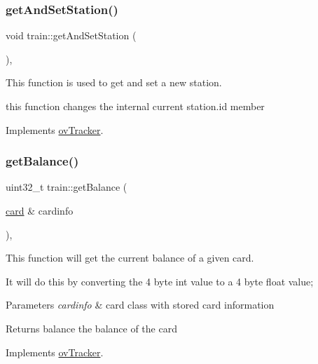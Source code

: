 \subsubsection{\texorpdfstring{get\+And\+Set\+Station()}{getAndSetStation()}}
{\footnotesize\ttfamily void train\+::get\+And\+Set\+Station (\begin{DoxyParamCaption}{ }\end{DoxyParamCaption})\hspace{0.3cm}{\ttfamily [override]}, {\ttfamily [virtual]}}



This function is used to get and set a new station. 

this function changes the internal current station.\+id member 

Implements \hyperlink{classovTracker_ae570f702740648f2994a0159616fa763}{ov\+Tracker}.

\mbox{\label{classtrain_a518b32482f1a5a32cc372b6679644b43}} 
\subsubsection{\texorpdfstring{get\+Balance()}{getBalance()}}
{\footnotesize\ttfamily uint32\+\_\+t train\+::get\+Balance (\begin{DoxyParamCaption}\item[{\hyperlink{classcard}{card} \&}]{cardinfo }\end{DoxyParamCaption})\hspace{0.3cm}{\ttfamily [override]}, {\ttfamily [virtual]}}



This function will get the current balance of a given card. 

It will do this by converting the 4 byte int value to a 4 byte float value; 
\begin{DoxyParams}{Parameters}
{\em cardinfo} & card class with stored card information \\
\hline
\end{DoxyParams}
\begin{DoxyReturn}{Returns}
balance the balance of the card 
\end{DoxyReturn}


Implements \hyperlink{classovTracker_a9bcfc435593679ec503a48da21d7a5a0}{ov\+Tracker}.

\mbox{\label{classtrain_ae788938711f5940abc9ad9fa09a77011}} 
